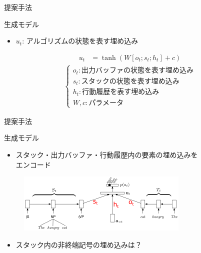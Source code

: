\documentclass[aspectratio=43,unicode,10pt]{beamer}
\begin{document}
\begin{frame}{提案手法}
  \begin{block}{生成モデル}
    \begin{itemize}
      \item $u_t$: アルゴリズムの状態を表す埋め込み
    \end{itemize}
    \begin{align*}
      u_t & = \tanh (W[o_t; s_t; h_t] + c)
    \end{align*}
    \begin{gather*}
      \begin{cases}
        o_t: \text{出力バッファの状態を表す埋め込み} \\
        s_t: \text{スタックの状態を表す埋め込み} \\
        h_t: \text{行動履歴を表す埋め込み} \\
        W, c: \text{パラメータ}
      \end{cases}
    \end{gather*}
  \end{block}
\end{frame}

\begin{frame}{提案手法}
  \begin{block}{生成モデル}
    \begin{itemize}
      \item スタック・出力バッファ・行動履歴内の要素の埋め込みを\\エンコード
    \end{itemize}
    \begin{figure}
      \includegraphics[width=\textwidth]{fig/fig_5.pdf}
    \end{figure}
    \begin{itemize}
      \item スタック内の非終端記号の埋め込みは？
    \end{itemize}
  \end{block}
\end{frame}
\end{document}
